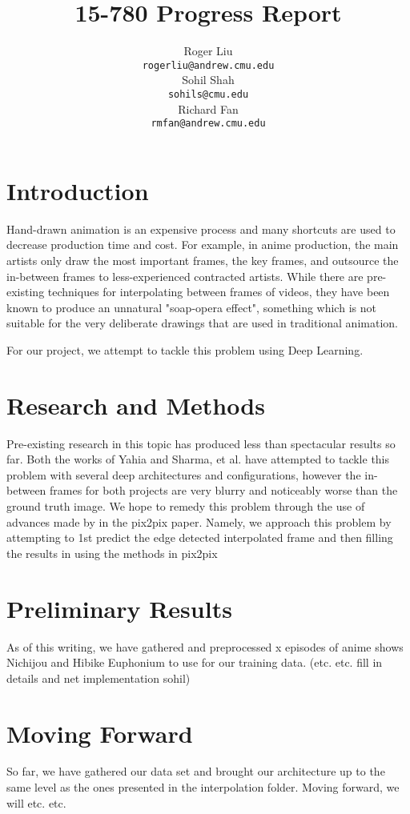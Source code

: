 \documentclass{article}
\title{15-780 Progress Report}
\author{
  Roger Liu \\
  \texttt{rogerliu@andrew.cmu.edu} \\
  \And
  Sohil Shah \\
  \texttt{sohils@cmu.edu} \\
  \And
  Richard Fan \\
  \texttt{rmfan@andrew.cmu.edu} \\
}
\begin{document}
\maketitle
\section{Introduction}
Hand-drawn animation is an expensive process and many shortcuts are used to decrease production time and cost. For example, in anime production, the main artists only draw the most important frames, the key frames, and outsource the in-between frames to less-experienced contracted artists. While there are pre-existing techniques for interpolating between frames of videos, they have been known to produce an unnatural "soap-opera effect", something which is not suitable for the very deliberate drawings that are used in traditional animation.

For our project, we attempt to tackle this problem using Deep Learning.

\section{Research and Methods}
Pre-existing research in this topic has produced less than spectacular results so far. 
Both the works of Yahia and Sharma, et al. have attempted to tackle this problem with several deep architectures and configurations, however the in-between frames for both projects are very blurry and noticeably worse than the ground truth image. We hope to remedy this problem through the use of advances made by in the pix2pix paper. Namely, we approach this problem by attempting to 1st predict the edge detected interpolated frame and then filling the results in using the methods in pix2pix

\section{Preliminary Results}
As of this writing, we have gathered and preprocessed x episodes of anime shows Nichijou and Hibike Euphonium to use for our training data. (etc. etc. fill in details and net implementation sohil)


\section{Moving Forward}
So far, we have gathered our data set and brought our architecture up to the same level as the ones presented in the interpolation folder. Moving forward, we will etc. etc.
\end{document}
